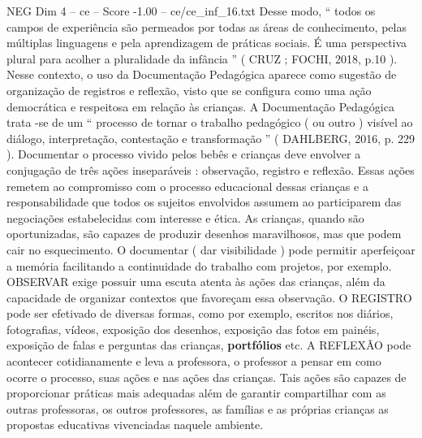 \begin{textsample}{NEG Dim 4 – ce – Score -1.00 – ce/ce\_inf\_16.txt}
Desse modo, “ todos os campos de experiência são permeados por todas as áreas de conhecimento, pelas múltiplas linguagens e pela aprendizagem de práticas sociais.
É uma perspectiva plural para acolher a pluralidade da infância ” ( CRUZ ; FOCHI, 2018, p.10 ).
Nesse contexto, o uso da Documentação Pedagógica aparece como sugestão de organização de registros e reflexão, visto que se configura como uma ação democrática e respeitosa em relação às crianças.
A Documentação Pedagógica trata -se de um “ processo de tornar o trabalho pedagógico ( ou outro ) visível ao diálogo, interpretação, contestação e transformação ” ( DAHLBERG, 2016, p. 229 ).
Documentar o processo vivido pelos bebês e crianças deve envolver a conjugação de três ações inseparáveis : observação, registro e reflexão.
Essas ações remetem ao compromisso com o processo educacional dessas crianças e a responsabilidade que todos os sujeitos envolvidos assumem ao participarem das negociações estabelecidas com interesse e ética.
As crianças, quando são oportunizadas, são capazes de produzir desenhos maravilhosos, mas que podem cair no esquecimento.
O documentar ( dar visibilidade ) pode permitir aperfeiçoar a memória facilitando a continuidade do trabalho com projetos, por exemplo.
OBSERVAR exige possuir uma escuta atenta às ações das crianças, além da capacidade de organizar contextos que favoreçam essa observação.
O REGISTRO pode ser efetivado de diversas formas, como por exemplo, escritos nos diários, fotografias, vídeos, exposição dos desenhos, exposição das fotos em painéis, exposição de falas e perguntas das crianças, \textbf{portfólios} etc.
A REFLEXÃO pode acontecer cotidianamente e leva a professora, o professor a pensar em como ocorre o processo, suas ações e nas ações das crianças.
Tais ações são capazes de proporcionar práticas mais adequadas além de garantir compartilhar com as outras professoras, os outros professores, as famílias e as próprias crianças as propostas educativas vivenciadas naquele ambiente.

\end{textsample}
